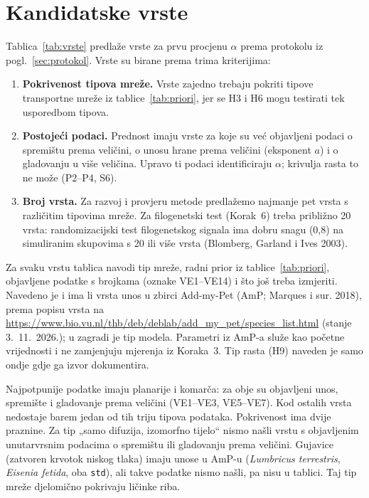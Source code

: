 \section{Kandidatske vrste}\label{sec:vrste}

\providecommand{\vrstaVE}[1]{\leavevmode{\sffamily\bfseries\color{akcent}VE#1}}

Tablica~\ref{tab:vrste} predlaže vrste za prvu procjenu $\alpha$ prema protokolu iz pogl.~\ref{sec:protokol}. Vrste su birane prema trima kriterijima:
\begin{enumerate}[leftmargin=1.6em]
\item \textbf{Pokrivenost tipova mreže.} Vrste zajedno trebaju pokriti tipove transportne mreže iz tablice~\ref{tab:priori}, jer se H3 i H6 mogu testirati tek usporedbom tipova.
\item \textbf{Postojeći podaci.} Prednost imaju vrste za koje su već objavljeni podaci o spremištu prema veličini, o unosu hrane prema veličini (eksponent $a$) i o gladovanju u više veličina. Upravo ti podaci identificiraju $\alpha$; krivulja rasta to ne može (P2–P4, S6).
\item \textbf{Broj vrsta.} Za razvoj i provjeru metode predlažemo najmanje pet vrsta s različitim tipovima mreže. Za filogenetski test (Korak~6) treba približno 20 vrsta: randomizacijski test filogenetskog signala ima dobru snagu (0,8) na simuliranim skupovima s 20 ili više vrsta (Blomberg, Garland i Ives 2003).
\end{enumerate}

Za svaku vrstu tablica navodi tip mreže, radni prior iz tablice~\ref{tab:priori}, objavljene podatke s brojkama (oznake VE1–VE14) i što još treba izmjeriti. Navedeno je i ima li vrsta unos u zbirci Add-my-Pet (AmP; Marques i sur. 2018), prema popisu vrsta na \url{https://www.bio.vu.nl/thb/deb/deblab/add_my_pet/species_list.html} (stanje 3.~11.~2026.); u zagradi je tip modela. Parametri iz AmP-a služe kao početne vrijednosti i ne zamjenjuju mjerenja iz Koraka~3. Tip rasta (H9) naveden je samo ondje gdje ga izvor dokumentira.

Najpotpunije podatke imaju planarije i komarča: za obje su objavljeni unos, spremište i gladovanje prema veličini (VE1–VE3, VE5–VE7). Kod ostalih vrsta nedostaje barem jedan od tih triju tipova podataka. Pokrivenost ima dvije praznine. Za tip „samo difuzija, izomorfno tijelo“ nismo našli vrstu s objavljenim unutarvrsnim podacima o spremištu ili gladovanju prema veličini. Gujavice (zatvoren krvotok niskog tlaka) imaju unose u AmP-u (\emph{Lumbricus terrestris}, \emph{Eisenia fetida}, oba \texttt{std}), ali takve podatke nismo našli, pa nisu u tablici. Taj tip mreže djelomično pokrivaju ličinke riba.

